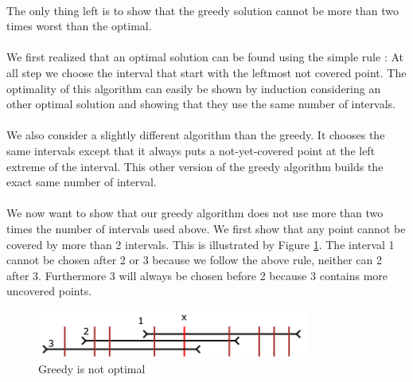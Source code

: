 \paragraph{}
The only thing left is to show that the greedy solution cannot be more than two times worst than the optimal.

\paragraph{}
We first realized that an optimal solution can be found using the simple rule : At all step we choose the interval that start with the leftmost not covered point. The optimality of this algorithm can easily be shown by induction considering an other optimal solution and showing that they use the same number of intervals.

\paragraph{}
We also consider a slightly different algorithm than the greedy. It chooses the same intervals except that it always puts a not-yet-covered point at the left extreme of the interval. This other version of the greedy algorithm builds the exact same number of interval.

\paragraph{}
We now want to show that our greedy algorithm does not use more than two times the number of intervals used above. We first show that any point cannot be covered by more than 2 intervals. This is illustrated by Figure \ref{fig:Diagramme3}. The interval 1 cannot be chosen after 2 or 3 because we follow the above rule, neither can 2 after 3. Furthermore 3 will always be chosen before 2 because 3 contains more uncovered points.

\begin{figure}[h]
	\centering
		\includegraphics[width=9cm]{Diagramme3.png}
	\caption{Greedy is not optimal}
	\label{fig:Diagramme3}
\end{figure}


